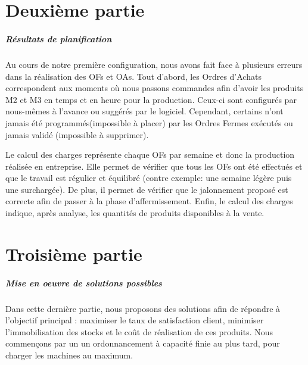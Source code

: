 \documentclass{scrreprt}
\begin{document}
\chapter{Deuxième partie} 

\paragraph{Résultats de planification}

Au cours de notre première configuration, nous avons fait face à plusieurs erreurs dans la réalisation des OFs et OAs. Tout d'abord, les Ordres d'Achats correspondent aux moments où nous passons commandes afin d'avoir les produits M2 et M3 en temps et en heure pour la production. Ceux-ci sont configurés par nous-mêmes à l'avance ou suggérés par le logiciel. Cependant, certains n'ont jamais été programmés(impossible à placer) par les Ordres Fermes exécutés  ou jamais validé (impossible à supprimer). 

Le calcul des charges représente chaque OFs par semaine et donc la production réalisée en entreprise.
Elle permet de vérifier que tous les OFs ont été effectués et que le travail est régulier et équilibré
(contre exemple: une semaine légère puis une surchargée). De plus, il permet de vérifier que le jalonnement proposé est correcte afin de passer à la phase d'affermissement. Enfin, le calcul des charges indique, après analyse, les quantités de produits disponibles à la vente.



\chapter{Troisième partie}

\paragraph{Mise en oeuvre de solutions possibles}

Dans cette dernière partie, nous proposons des solutions afin de répondre à l'objectif principal : maximiser le taux de satisfaction client, minimiser l'immobilisation des stocks et
le coût de réalisation de ces produits. Nous commençons par un un ordonnancement à capacité finie au plus tard, pour charger les machines au maximum.
\end{document}
